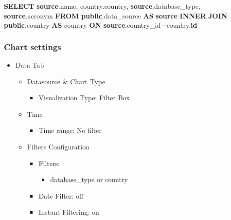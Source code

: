 \documentclass[
]{book}
\newenvironment{Shaded}{\begin{snugshade}}{\end{snugshade}}
\newcommand{\KeywordTok}[1]{\textcolor[rgb]{0.13,0.29,0.53}{\textbf{#1}}}
\newcommand{\NormalTok}[1]{#1}
\newcommand{\OperatorTok}[1]{\textcolor[rgb]{0.81,0.36,0.00}{\textbf{#1}}}
\providecommand{\tightlist}{%
  \setlength{\itemsep}{0pt}\setlength{\parskip}{0pt}}
\begin{document}
\begin{Shaded}
\begin{Highlighting}[]
\KeywordTok{SELECT} \KeywordTok{source}\NormalTok{.name,}
\NormalTok{       country.country,}
       \KeywordTok{source}\NormalTok{.database\_type,}
       \KeywordTok{source}\NormalTok{.acronym}
\KeywordTok{FROM} \KeywordTok{public}\NormalTok{.data\_source }\KeywordTok{AS} \KeywordTok{source}
\KeywordTok{INNER} \KeywordTok{JOIN} \KeywordTok{public}\NormalTok{.country }\KeywordTok{AS}\NormalTok{ country }\KeywordTok{ON} \KeywordTok{source}\NormalTok{.country\_id}\OperatorTok{=}\NormalTok{country.}\KeywordTok{id}
\end{Highlighting}
\end{Shaded}

\hypertarget{chart-settings-9}{%
\subsubsection*{Chart settings}\label{chart-settings-9}}

\begin{itemize}
\tightlist
\item
  Data Tab

  \begin{itemize}
  \tightlist
  \item
    Datasource \& Chart Type

    \begin{itemize}
    \tightlist
    \item
      Visualization Type: Filter Box
    \end{itemize}
  \item
    Time

    \begin{itemize}
    \tightlist
    \item
      Time range: No filter
    \end{itemize}
  \item
    Filters Configuration

    \begin{itemize}
    \tightlist
    \item
      Filters:

      \begin{itemize}
      \tightlist
      \item
        database\_type or country
      \end{itemize}
    \item
      Date Filter: off
    \item
      Instant Filtering: on
    \end{itemize}
  \end{itemize}
\end{itemize}
\end{document}
